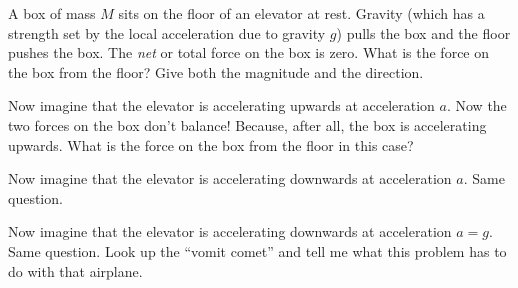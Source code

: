 \documentclass[12pt, letterpaper]{article}
\begin{document}
\begin{problem}
A box of mass $M$ sits on the floor of an elevator at rest. Gravity
(which has a strength set by the local acceleration due to gravity
$g$) pulls the box and the floor pushes the box. The \emph{net} or
total force on the box is zero. What is the force on the box from the
floor? Give both the magnitude and the direction.

Now imagine that the elevator is accelerating upwards at acceleration $a$.
Now the two forces on the box don't balance! Because, after all, the box
is accelerating upwards. What is the force on the box from the floor in this
case?

Now imagine that the elevator is accelerating downwards at acceleration $a$.
Same question.

Now imagine that the elevator is accelerating downwards at acceleration $a = g$.
Same question. Look up the ``vomit comet'' and tell me what this problem has to
do with that airplane.
\end{problem}
\end{document}
